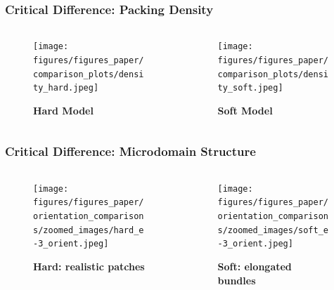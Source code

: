 \documentclass[10pt,t]{beamer}
\begin{document}
\begin{frame}
    \frametitle{Critical Difference: Packing Density}

    \begin{columns}
        \begin{column}{0.5\textwidth}
            \begin{figure}
                \centering
                \texttt{[image: figures/figures\_paper/comparison\_plots/density\_hard.jpeg]}
                \caption*{\textbf{Hard Model}}
            \end{figure}
        \end{column}

        \begin{column}{0.5\textwidth}
            \begin{figure}
                \centering
                \texttt{[image: figures/figures\_paper/comparison\_plots/density\_soft.jpeg]}
                \caption*{\textbf{Soft Model}}
            \end{figure}
        \end{column}
    \end{columns}

\end{frame}


\begin{frame}
    \frametitle{Critical Difference: Microdomain Structure}

    \begin{columns}
        \begin{column}{0.5\textwidth}
            \begin{figure}
                \centering
                \texttt{[image: figures/figures\_paper/orientation\_comparisons/zoomed\_images/hard\_e-3\_orient.jpeg]}
                \caption*{\textbf{Hard: realistic patches }}
            \end{figure}
        \end{column}

        \begin{column}{0.5\textwidth}
            \begin{figure}
                \centering
                \texttt{[image: figures/figures\_paper/orientation\_comparisons/zoomed\_images/soft\_e-3\_orient.jpeg]}
                \caption*{\textbf{Soft: elongated bundles }}
            \end{figure}
        \end{column}
    \end{columns}

\end{frame}
\end{document}
